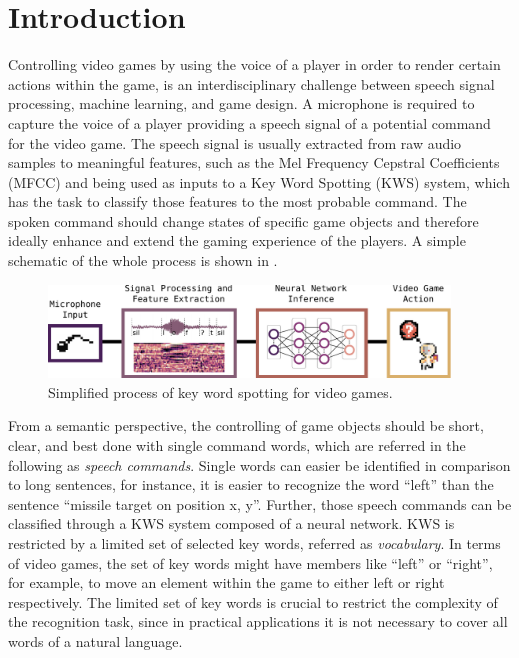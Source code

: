 
\chapter{Introduction}\label{sec:intro}
Controlling video games by using the voice of a player in order to render certain actions within the game, is an interdisciplinary challenge between speech signal processing, machine learning, and game design.
A microphone is required to capture the voice of a player providing a speech signal of a potential command for the video game.
The speech signal is usually extracted from raw audio samples to meaningful features, such as the Mel Frequency Cepstral Coefficients (MFCC) and being used as inputs to a Key Word Spotting (KWS) system, which has the task to classify those features to the most probable command.
The spoken command should change states of specific game objects and therefore ideally enhance and extend the gaming experience of the players.
A simple schematic of the whole process is shown in .
\begin{figure}[!ht]
  \centering
    \includegraphics[width=0.95\textwidth]{./1_intro/figs/intro_kws.pdf}
  \caption{Simplified process of key word spotting for video games.}
  \label{fig:intro_kws}
\end{figure}
\FloatBarrier
\noindent
From a semantic perspective, the controlling of game objects should be short, clear, and best done with single command words, which are referred in the following as \emph{speech commands}.
Single words can easier be identified in comparison to long sentences, for instance, it is easier to recognize the word \enquote{left} than the sentence \enquote{missile target on position x, y}.
Further, those speech commands can be classified through a KWS system composed of a neural network.
KWS is restricted by a limited set of selected key words, referred as \emph{vocabulary}.
In terms of video games, the set of key words might have members like \enquote{left} or \enquote{right}, for example, to move an element within the game to either left or right respectively.
The limited set of key words is crucial to restrict the complexity of the recognition task, since in practical applications it is not necessary to cover all words of a natural language.
